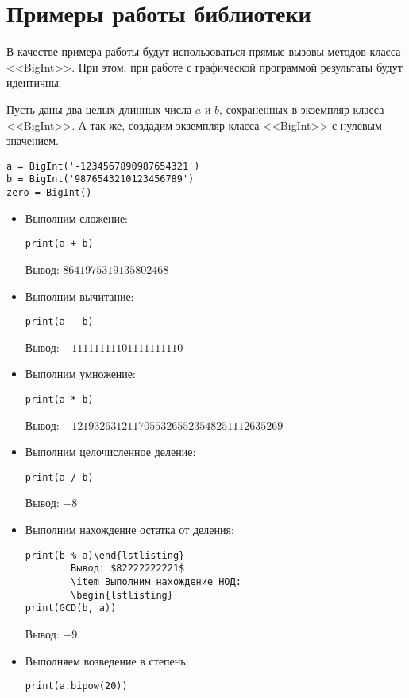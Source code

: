 \clearpage
\section{Примеры работы библиотеки}
В качестве примера работы будут использоваться прямые вызовы методов класса <<BigInt>>.
При этом, при работе с графической программой результаты будут идентичны.

Пусть даны два целых длинных числа $a$ и $b$, сохраненных в экземпляр класса <<BigInt>>.
А так же, создадим экземпляр класса <<BigInt>> с нулевым значением.
    \begin{lstlisting}
a = BigInt('-1234567890987654321')
b = BigInt('9876543210123456789')
zero = BigInt()\end{lstlisting}

    \begin{itemize}
        \item Выполним сложение:
        \begin{lstlisting}
print(a + b)\end{lstlisting}
        Вывод: $8641975319135802468$
        \item Выполним вычитание:
        \begin{lstlisting}
print(a - b)\end{lstlisting}
        Вывод: $-11111111101111111110$
        \item Выполним умножение:
        \begin{lstlisting}
print(a * b)\end{lstlisting}
        Вывод: $-12193263121170553265523548251112635269$
        \item Выполним целочисленное деление:
        \begin{lstlisting}
print(a / b)\end{lstlisting}
        Вывод: $-8$
        \item Выполним нахождение остатка от деления:
        \begin{lstlisting}
print(b % a)\end{lstlisting}
        Вывод: $82222222221$
        \item Выполним нахождение НОД:
        \begin{lstlisting}
print(GCD(b, a))\end{lstlisting}
        Вывод: $-9$
        \item Выполняем возведение в степень:
        \begin{lstlisting}
print(a.bipow(20))\end{lstlisting}

\end{itemize}
